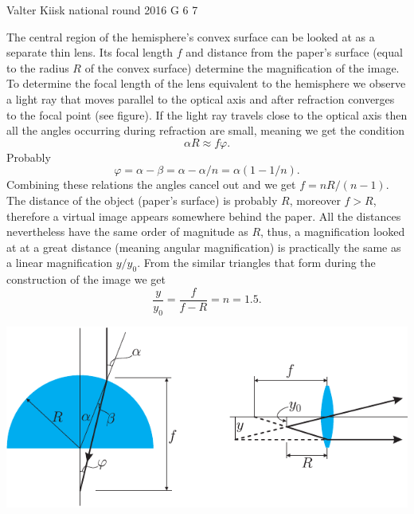 \documentclass[11pt]{article}
\begin{document}
{Valter Kiisk} %
{national round} %
{2016} %
{G 6} %
{7} %
{

\ifEngSolution
The central region of the hemisphere’s convex surface can be looked at as a separate thin lens. Its focal length $f$ and distance from the paper’s surface (equal to the radius $R$ of the convex surface) determine the magnification of the image. To determine the focal length of the lens equivalent to the hemisphere we observe a light ray that moves parallel to the optical axis and after refraction converges to the focal point (see figure). If the light ray travels close to the optical axis then all the angles occurring during refraction are small, meaning we get the condition
\[
\alpha R\approx f\varphi.
\]
Probably
\[
\varphi = \alpha - \beta=\alpha-\alpha/n=\alpha(1-1/n).
\]
Combining these relations the angles cancel out and we get $f=nR/(n-1)$. The distance of the object (paper’s surface) is probably $R$, moreover $f > R$, therefore a virtual image appears somewhere behind the paper. All the distances nevertheless have the same order of magnitude as $R$, thus, a magnification looked at at a great distance (meaning angular magnification) is practically the same as a linear magnification $y/y_0$. From the similar triangles that form during the construction of the image we get
\[
\frac{y}{y_0}=\frac{f}{f-R}=n=\num{1.5}.
\]  
\begin{center}
	\includegraphics[scale=1.2]{2016-v3g-06-luup-lah}
\end{center}
\fi
}
\end{document}
